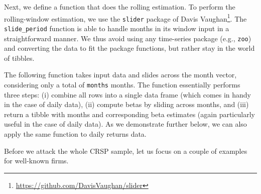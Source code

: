 \documentclass[
]{krantz}
\newenvironment{Shaded}{\begin{snugshade}}{\end{snugshade}}
\newcommand{\AttributeTok}[1]{\textcolor[rgb]{0.61,0.61,0.61}{#1}}
\newcommand{\ConstantTok}[1]{\textcolor[rgb]{0,0,0}{#1}}
\newcommand{\ControlFlowTok}[1]{\textcolor[rgb]{0.27,0.27,0.27}{\textbf{#1}}}
\newcommand{\DecValTok}[1]{\textcolor[rgb]{0.06,0.06,0.06}{#1}}
\newcommand{\FunctionTok}[1]{\textcolor[rgb]{0,0,0}{#1}}
\newcommand{\NormalTok}[1]{#1}
\newcommand{\OtherTok}[1]{\textcolor[rgb]{0.37,0.37,0.37}{#1}}
\newcommand{\SpecialCharTok}[1]{\textcolor[rgb]{0,0,0}{#1}}
\newcommand{\StringTok}[1]{\textcolor[rgb]{0.5,0.5,0.5}{#1}}
\renewcommand{\href}[2]{#2\footnote{\url{#1}}}
\begin{document}
Next, we define a function that does the rolling estimation. To perform the rolling-window estimation, we use the \texttt{slider} package of \href{https://github.com/DavisVaughan/slider}{Davis Vaughan}. The \texttt{slide\_period} function is able to handle months in its window input in a straightforward manner. We thus avoid using any time-series package (e.g., \texttt{zoo}) and converting the data to fit the package functions, but rather stay in the world of tibbles.

The following function takes input data and slides across the month vector, considering only a total of \texttt{months} months. The function essentially performs three steps: (i) combine all rows into a single data frame (which comes in handy in the case of daily data), (ii) compute betas by sliding across months, and (iii) return a tibble with months and corresponding beta estimates (again particularly useful in the case of daily data).
As we demonstrate further below, we can also apply the same function to daily returns data.

\begin{Shaded}
\end{Shaded}

Before we attack the whole CRSP sample, let us focus on a couple of examples for well-known firms.
\end{document}
